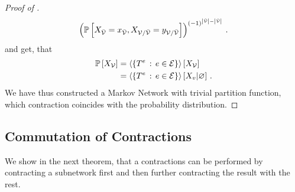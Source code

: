 \begin{proof}[Proof of ]
\begin{align*}
		\left(
			\mathbb{P}\left[X_{\bar{\mathcal{V}}}=x_{\bar{\mathcal{V}}},X_{\mathcal{V}/\bar{\mathcal{V}}}=y_{\mathcal{V}/\bar{\mathcal{V}}}\right]
		\right)^{(-1)^{\left|\tilde{\mathcal{V}}\right|-\left|\bar{\mathcal{V}}\right|}} \, . 
	\end{align*}
	and get, that 
	\begin{align*}
		\mathbb{P}\left[X_{\mathcal{V}}\right] & = \left\langle \{T^{e}\, : \, e\in\mathcal{E}\}\right\rangle \left[ X_{\mathcal{V}} \right] \\
		& = \left\langle \{T^{e}\, : \, e\in\mathcal{E}\}\right\rangle \left[ X_{v} | \varnothing \right] \, .
	\end{align*}
	We have thus constructed a Markov Network with trivial partition function, which contraction coincides with the probability distribution.
\end{proof}





\subsection{Commutation of Contractions}

We show in the next theorem, that a contractions can be performed by contracting a subnetwork first and then further contracting the result with the rest. 




